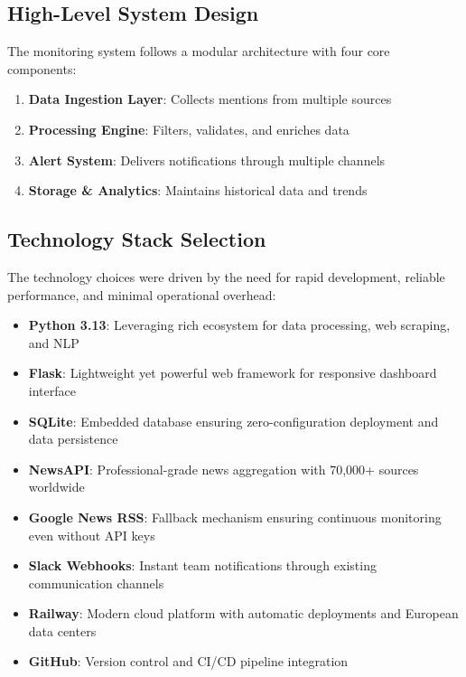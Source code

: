 \documentclass[11pt]{article}
\begin{document}
\subsection{High-Level System Design}

The monitoring system follows a modular architecture with four core components:

\begin{enumerate}
    \item \textbf{Data Ingestion Layer}: Collects mentions from multiple sources
    \item \textbf{Processing Engine}: Filters, validates, and enriches data
    \item \textbf{Alert System}: Delivers notifications through multiple channels
    \item \textbf{Storage \& Analytics}: Maintains historical data and trends
\end{enumerate}

\subsection{Technology Stack Selection}

The technology choices were driven by the need for rapid development, reliable performance, and minimal operational overhead:

\begin{itemize}
    \item \textbf{Python 3.13}: Leveraging rich ecosystem for data processing, web scraping, and NLP
    \item \textbf{Flask}: Lightweight yet powerful web framework for responsive dashboard interface
    \item \textbf{SQLite}: Embedded database ensuring zero-configuration deployment and data persistence
    \item \textbf{NewsAPI}: Professional-grade news aggregation with 70,000+ sources worldwide
    \item \textbf{Google News RSS}: Fallback mechanism ensuring continuous monitoring even without API keys
    \item \textbf{Slack Webhooks}: Instant team notifications through existing communication channels
    \item \textbf{Railway}: Modern cloud platform with automatic deployments and European data centers
    \item \textbf{GitHub}: Version control and CI/CD pipeline integration
\end{itemize}
\end{document}
